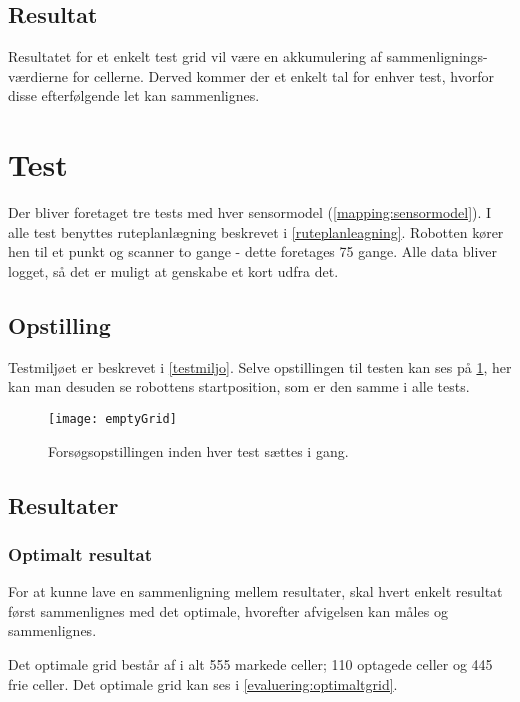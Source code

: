 \subsection{Resultat}
Resultatet for et enkelt test grid vil være en akkumulering af sammenlignings-værdierne for cellerne.
Derved kommer der et enkelt tal for enhver test, hvorfor disse efterfølgende let kan sammenlignes.

\section{Test}\label{evaluering:test_beskrivelse}
Der bliver foretaget tre tests med hver sensormodel (\cref{mapping:sensormodel}).
I alle test benyttes ruteplanlægning beskrevet i \cref{ruteplanleagning}.
Robotten kører hen til et punkt og scanner to gange - dette foretages 75 gange.
Alle data bliver logget, så det er muligt at genskabe et kort udfra det.

\subsection{Opstilling}\label{evaluering:opstilling}
Testmiljøet er beskrevet i \cref{testmiljo}.
Selve opstillingen til testen kan ses på \cref{evaluering:emptyGrid}, her kan man desuden se robottens startposition, som er den samme i alle tests.

\begin{figure}[h]
\texttt{[image: emptyGrid]}
\caption{Forsøgsopstillingen inden hver test sættes i gang.}
\label{evaluering:emptyGrid}
\end{figure}

\subsection{Resultater}

\subsubsection*{Optimalt resultat}
For at kunne lave en sammenligning mellem resultater, skal hvert enkelt resultat først sammenlignes med det optimale, hvorefter afvigelsen kan måles og sammenlignes.

Det optimale grid består af i alt 555 markede celler; 110 optagede celler og 445 frie celler.
Det optimale grid kan ses i \cref{evaluering:optimaltgrid}.

